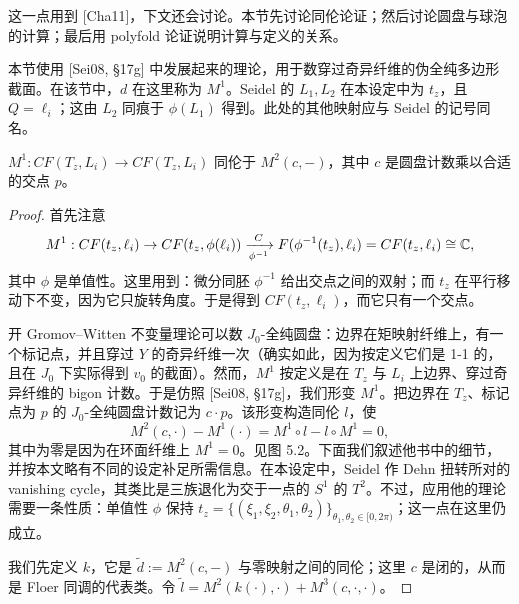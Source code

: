 这一点用到 [Cha11]，下文还会讨论。本节先讨论同伦论证；然后讨论圆盘与球泡的计算；最后用 polyfold 论证说明计算与定义的关系。

\begin{remark}[记号]\label{rem:notation-seidel}
本节使用 [Sei08, §17g] 中发展起来的理论，用于数穿过奇异纤维的伪全纯多边形截面。在该节中，$d$ 在这里称为 $M^1$。Seidel 的 $L_1,L_2$ 在本设定中为 $t_z$，且 $Q=\ell_i$；这由 $L_2$ 同痕于 $\phi(L_1)$ 得到。此处的其他映射应与 Seidel 的记号同名。
\end{remark}


\begin{lemma}\label{lem:M1-homotopic}
$M^1:CF(T_z,L_i)\to CF(T_z,L_i)$ 同伦于 $M^2(c,-)$，其中 $c$ 是圆盘计数乘以合适的交点 $p$。
\end{lemma}

\begin{proof}
首先注意
\[
M^1:CF(t_z,\ell_i)\to CF(t_z,\phi(\ell_i))
\xrightarrow[\phi^{-1}]{C}F(\phi^{-1}(t_z),\ell_i)=CF(t_z,\ell_i)\cong\mathbb{C},
\]
其中 $\phi$ 是单值性。这里用到：微分同胚 $\phi^{-1}$ 给出交点之间的双射；而 $t_z$ 在平行移动下不变，因为它只旋转角度。于是得到 $CF(t_z,\ell_i)$，而它只有一个交点。

开 Gromov--Witten 不变量理论可以数 $J_0$-全纯圆盘：边界在矩映射纤维上，有一个标记点，并且穿过 $Y$ 的奇异纤维一次（确实如此，因为按定义它们是 1-1 的，且在 $J_0$ 下实际得到 $v_0$ 的截面）。然而，$M^1$ 按定义是在 $T_z$ 与 $L_i$ 上边界、穿过奇异纤维的 bigon 计数。于是仿照 [Sei08, §17g]，我们形变 $M^1$。把边界在 $T_z$、标记点为 $p$ 的 $J_0$-全纯圆盘计数记为 $c\cdot p$。该形变构造同伦 $l$，使
\[
M^2(c,\cdot)-M^1(\cdot)=M^1\circ l-l\circ M^1=0,
\]
其中为零是因为在环面纤维上 $M^1=0$。见图 5.2。下面我们叙述他书中的细节，并按本文略有不同的设定补足所需信息。在本设定中，Seidel 作 Dehn 扭转所对的 vanishing cycle，其类比是三族退化为交于一点的 $S^1$ 的 $T^2$。不过，应用他的理论需要一条性质：单值性 $\phi$ 保持 $t_z=\{(\xi_1,\xi_2,\theta_1,\theta_2)\}_{\theta_1,\theta_2\in[0,2\pi)}$；这一点在这里仍成立。

我们先定义 $k$，它是 $\tilde d:=M^2(c,-)$ 与零映射之间的同伦；这里 $c$ 是闭的，从而是 Floer 同调的代表类。令 $\tilde l=M^2(k(\cdot),\cdot)+M^3(c,\cdot,\cdot)$。
\end{proof}

